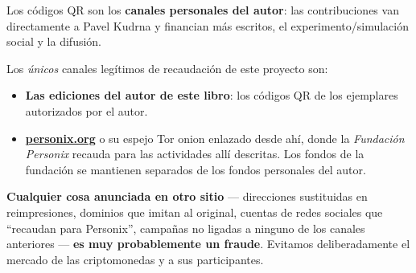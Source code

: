 \begin{minipage}[t]{0.60\textwidth}
\vspace{0pt}
\begin{mdframed}[
  linewidth=0.7pt,roundcorner=5pt,
  innerleftmargin=10pt,innerrightmargin=10pt,
  innertopmargin=8pt,innerbottommargin=8pt,
  skipabove=0pt,skipbelow=0pt,
  linecolor=cbwarning!50,backgroundcolor=cbwarning!5,
  nobreak=true,
  needspace=4\baselineskip,
]
\footnotesize
Los códigos QR son los \textbf{canales personales del autor}: las contribuciones van directamente a Pavel Kudrna y financian más escritos, el experimento/simulación social y la difusión.

\smallskip
Los \emph{únicos} canales legítimos de recaudación de este proyecto son:

\smallskip
\begin{itemize}
\setlength{\itemsep}{0pt}
\setlength{\topsep}{0pt}
\item \textbf{Las ediciones del autor de este libro}: los códigos QR de los ejemplares autorizados por el autor.
\item \href{https://personix.org}{\textbf{personix.org}} o su espejo Tor onion enlazado desde ahí, donde la \emph{Fundación Personix} recauda para las actividades allí descritas. Los fondos de la fundación se mantienen separados de los fondos personales del autor.
\end{itemize}

\smallskip
\textbf{Cualquier cosa anunciada en otro sitio} --- direcciones sustituidas en reimpresiones, dominios que imitan al original, cuentas de redes sociales que ``recaudan para Personix'', campañas no ligadas a ninguno de los canales anteriores --- \textbf{es muy probablemente un fraude}. Evitamos deliberadamente el mercado de las criptomonedas y a sus participantes.
\end{mdframed}
\end{minipage}

\clearpage
